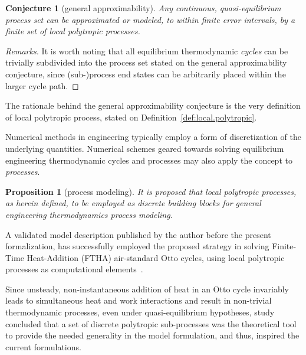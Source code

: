 \documentclass[fleqn,11pt]{SelfArx}
\newtheorem{conjecture}{Conjecture}
\newtheorem{proposition}{Proposition}
\begin{document}
    \begin{conjecture}[general approximability]\label{conj:gen.approx}
        Any continuous, quasi-equilibrium process set can be approximated or modeled, to  within
        finite error intervals, by a finite set of local polytropic processes.
    \end{conjecture}

    \begin{proof}[Remarks]
        It is worth noting that all equilibrium thermodynamic  \emph{cycles}  can  be  trivially
        subdivided into the process set stated on the general approximability conjecture,  since
        (sub-)process end states can be arbitrarily placed within the larger cycle path.
    \end{proof}

    The rationale behind the general approximability conjecture is the very definition of  local
    polytropic process, stated on Definition~\ref{def:local.polytropic}.

    Numerical methods in engineering typically employ a form of discretization of the underlying
    quantities. Numerical schemes geared towards solving equilibrium  engineering  thermodynamic
    cycles and processes may also apply the concept to \emph{processes}.

    \begin{proposition}[process modeling]\label{prop:proc.model}
        It is proposed that local polytropic processes, as herein defined,  to  be  employed  as
        discrete building blocks for general engineering thermodynamics process modeling.
    \end{proposition}

    A validated model description published by the author before the present formalization,  has
    successfully employed the proposed strategy  in  solving  Finite-Time  Heat-Addition  (FTHA)
    air-standard   Otto   cycles,   using   local   polytropic   processes   as    computational
    elements~\cite{2017-NaaktgeborenC-IntJMechEngEduc}.

    Since unsteady, non-instantaneous addition of heat in an  Otto  cycle  invariably  leads  to
    simultaneous heat and work interactions and result in non-trivial  thermodynamic  processes,
    even  under  quasi-equilibrium  hypotheses,  study~\cite{2017-NaaktgeborenC-IntJMechEngEduc}
    concluded that a set of discrete  polytropic  sub-processes  was  the  theoretical  tool  to
    provide the needed generality in the model  formulation,  and  thus,  inspired  the  current
    formulations.
\end{document}
